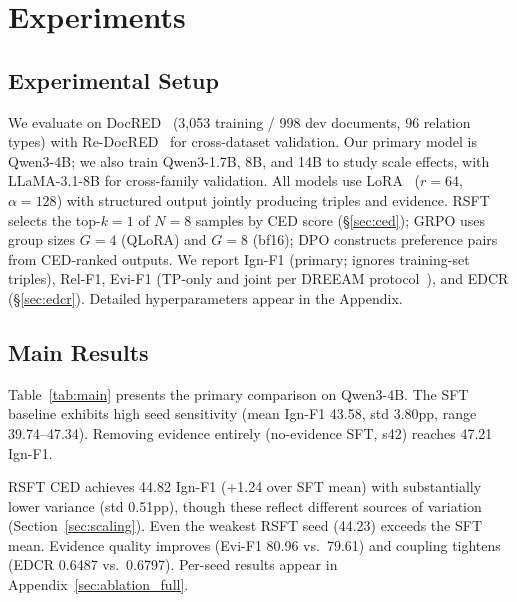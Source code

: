 \section{Experiments}
\label{sec:experiments}

\subsection{Experimental Setup}
\label{sec:setup}

We evaluate on DocRED~\citep{yao2019docred} (3,053 training / 998 dev documents, 96 relation types) with Re-DocRED~\citep{tan2022redocred} for cross-dataset validation. Our primary model is Qwen3-4B; we also train Qwen3-1.7B, 8B, and 14B to study scale effects, with LLaMA-3.1-8B for cross-family validation. All models use LoRA~\citep{hu2022lora} ($r{=}64$, $\alpha{=}128$) with structured output jointly producing triples and evidence. RSFT selects the top-$k{=}1$ of $N{=}8$ samples by CED score (\S\ref{sec:ced}); GRPO uses group sizes $G{=}4$ (QLoRA) and $G{=}8$ (bf16); DPO constructs preference pairs from CED-ranked outputs. We report Ign-F1 (primary; ignores training-set triples), Rel-F1, Evi-F1 (TP-only and joint per DREEAM protocol~\citep{ma2023dreeam}), and EDCR (\S\ref{sec:edcr}). Detailed hyperparameters appear in the Appendix.


\subsection{Main Results}
\label{sec:main_results}

Table~\ref{tab:main} presents the primary comparison on Qwen3-4B. The SFT baseline exhibits high seed sensitivity (mean Ign-F1 43.58, std 3.80pp, range 39.74--47.34). Removing evidence entirely (no-evidence SFT, s42) reaches 47.21 Ign-F1.

RSFT CED achieves 44.82 Ign-F1 (+1.24 over SFT mean) with substantially lower variance (std 0.51pp), though these reflect different sources of variation (Section~\ref{sec:scaling}). Even the weakest RSFT seed (44.23) exceeds the SFT mean. Evidence quality improves (Evi-F1 80.96 vs.\ 79.61) and coupling tightens (EDCR 0.6487 vs.\ 0.6797). Per-seed results appear in Appendix~\ref{sec:ablation_full}.

